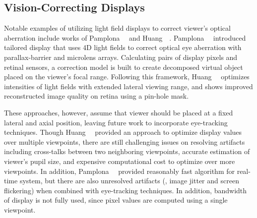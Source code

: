 \subsection{Vision-Correcting Displays}\label{ss:vision-correcting-displays}
Notable examples of utilizing light field displays to correct viewer’s optical aberration include works of Pamplona~\etal~\cite{pamplona12} and Huang~\etal~\cite{huang14}. Pamplona~\etal~\cite{pamplona12} introduced tailored display that uses 4D light fields to correct optical eye aberration with parallax-barrier and microlens arrays. Calculating pairs of display pixels and retinal sensors, a correction model is built to create decomposed virtual object placed on the viewer’s focal range. Following this framework, Huang~\etal~\cite{huang14} optimizes intensities of light fields with extended lateral viewing range, and shows improved reconstructed image quality on retina using a pin-hole mask.
 
These approaches, however, assume that viewer should be placed at a fixed lateral and axial position, leaving future work to incorporate eye-tracking techniques. Though Huang~\etal~\cite{huang14} provided an approach to optimize display values over multiple viewpoints, there are still challenging issues on resolving artifacts including cross-talks between two neighboring viewpoints, accurate estimation of viewer’s pupil size, and expensive computational cost to optimize over more viewpoints. In addition, Pamplona~\etal~\cite{pamplona12} provided reasonably fast algorithm for real-time system, but there are also unresolved artifacts (\ie, image jitter and screen flickering) when combined with eye-tracking techniques. In addition, bandwidth of display is not fully used, since pixel values are computed using a single viewpoint.
